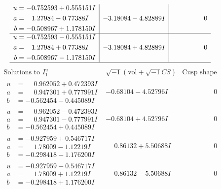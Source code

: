 \documentclass[1p]{elsarticle_modified}
\theoremstyle{definition}
\newcommand{\I}{\sqrt{-1}}
\begin{document}
$$\begin{array}{c|c|c}
\begin{aligned}
u &= -0.752593 + 0.555151 I \\
a &= \phantom{-}1.27984 - 0.77388 I \\
b &= -0.508967 + 1.178150 I\end{aligned}
 & -3.18084 - 4.82889 I & \phantom{-0.000000 } 0 \\ \hline\begin{aligned}
u &= -0.752593 - 0.555151 I \\
a &= \phantom{-}1.27984 + 0.77388 I \\
b &= -0.508967 - 1.178150 I\end{aligned}
 & -3.18084 + 4.82889 I & \phantom{-0.000000 } 0\\
 \hline 
 \end{array}$$\newpage$$\begin{array}{c|c|c}  
\text{Solutions to }I^u_{1}& \I (\text{vol} + \sqrt{-1}CS) & \text{Cusp shape}\\
 \hline 
\begin{aligned}
u &= \phantom{-}0.962052 + 0.472393 I \\
a &= \phantom{-}0.947301 + 0.777991 I \\
b &= -0.562454 - 0.445089 I\end{aligned}
 & -0.68104 - 4.52796 I & \phantom{-0.000000 } 0 \\ \hline\begin{aligned}
u &= \phantom{-}0.962052 - 0.472393 I \\
a &= \phantom{-}0.947301 - 0.777991 I \\
b &= -0.562454 + 0.445089 I\end{aligned}
 & -0.68104 + 4.52796 I & \phantom{-0.000000 } 0 \\ \hline\begin{aligned}
u &= -0.927959 + 0.546717 I \\
a &= \phantom{-}1.78009 - 1.12219 I \\
b &= -0.298418 - 1.176200 I\end{aligned}
 & \phantom{-}0.86132 + 5.50688 I & \phantom{-0.000000 } 0 \\ \hline\begin{aligned}
u &= -0.927959 - 0.546717 I \\
a &= \phantom{-}1.78009 + 1.12219 I \\
b &= -0.298418 + 1.176200 I\end{aligned}
 & \phantom{-}0.86132 - 5.50688 I & \phantom{-0.000000 } 0 \\ \hline\begin{aligned}

\end{aligned}
\end{array}$$
\end{document}
